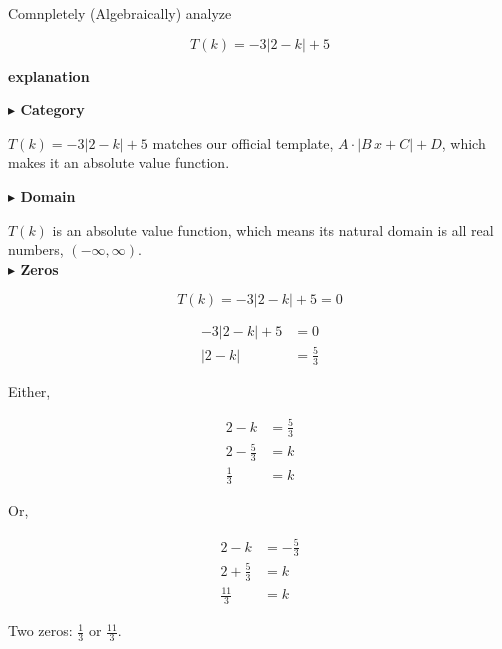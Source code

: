 \documentclass{ximera}
\begin{document}
\begin{example}

Comnpletely (Algebraically) analyze

\[
T(k) = -3 | 2 - k | + 5
\]



\textbf{\textcolor{red!75!green}{explanation}} 





\textbf{\textcolor{blue!55!black}{$\blacktriangleright$ Category}} 



$T(k) = -3 | 2 - k | + 5$ matches our official template, $A \cdot | B \, x + C| + D$, which makes it an absolute value function.  





\textbf{\textcolor{blue!55!black}{$\blacktriangleright$ Domain}} 


$T(k)$ is an absolute value function, which means its natural domain is all real numbers, $(-\infty, \infty)$. \\






\textbf{\textcolor{blue!55!black}{$\blacktriangleright$ Zeros}} 

\[
T(k) = -3 | 2 - k | + 5 = 0
\]

\begin{align*}
-3 | 2 - k | + 5 &= 0 \\
| 2 - k | &= \frac{5}{3} 
\end{align*}


Either,


\begin{align*}
2 - k &= \frac{5}{3} \\
2 - \frac{5}{3} &= k \\ 
\frac{1}{3} &= k 
\end{align*}


Or, 





\begin{align*}
2 - k &= -\frac{5}{3} \\
2 + \frac{5}{3} &= k \\ 
\frac{11}{3} &= k 
\end{align*}


Two zeros: $\frac{1}{3}$ or $\frac{11}{3}$. 

















\end{example}
\end{document}
